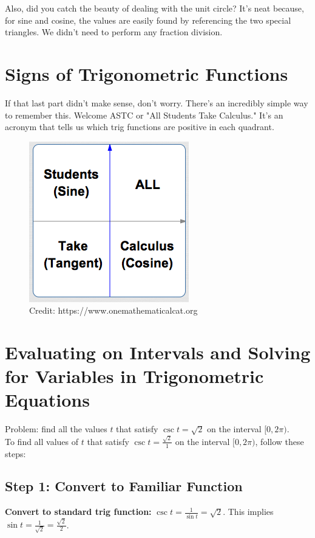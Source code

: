 \documentclass[12pt]{article}
\begin{document}
Also, did you catch the beauty of dealing with the unit circle? It's neat because, for sine and cosine, the values are easily found by referencing the two special triangles. We didn't need to perform any fraction division.\\

\section{Signs of Trigonometric Functions}

If that last part didn't make sense, don't worry. There's an incredibly simple way to remember this. Welcome ASTC or "All Students Take Calculus." It's an acronym that tells us which trig functions are positive in each quadrant.\\

\begin{figure}[ht]
	\centering
	\includegraphics[scale=.75]{memoryDeviceSigns}
	\caption{Credit: https://www.onemathematicalcat.org}
\end{figure}

\section{Evaluating on Intervals and Solving for Variables in Trigonometric Equations}

Problem: find all the values \(t\) that satisfy \(\csc{t}=\sqrt{2}\) on the interval \([0,2\pi)\).\\

To find all values of \( t \) that satisfy \( \csc t = \frac{\sqrt{2}}{1} \) on the interval \( [0, 2\pi) \), follow these steps:

\subsection*{Step 1: Convert to Familiar Function}
\textbf{Convert to standard trig function:} \( \csc t = \frac{1}{\sin t} = \sqrt{2} \). This implies \( \sin t = \frac{1}{\sqrt{2}} = \frac{\sqrt{2}}{2} \).
\end{document}
